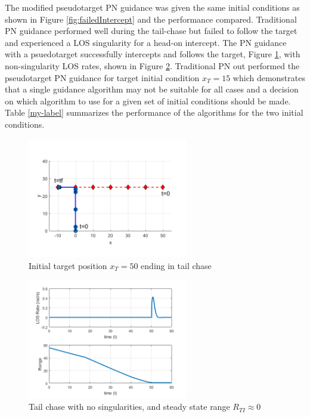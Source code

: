 \documentclass[conference]{IEEEtran}
\begin{document}
The modified pseudotarget PN guidance was given the same initial conditions as shown in Figure \ref{fig:failedIntercept} and the performance compared. Traditional PN guidance performed well during the tail-chase but failed to follow the target and experienced a LOS singularity for a head-on intercept. The PN guidance with a psuedotarget successfully intercepts and follows the target, Figure \ref{fig:modifiedPNsuccess}, with non-singularity LOS rates, shown in Figure \ref{fig:modifiedPNsuccessLOS}. Traditional PN out performed the pseudotarget PN guidance for target initial condition $x_{T} = 15$ which demonstrates that a single guidance algorithm may not be suitable for all cases and a decision on which algorithm to use for a given set of initial conditions should be made. Table \ref{my-label} summarizes the performance of the algorithms for the two initial conditions.



\begin{figure}[H]
	\centering
	\includegraphics[width=7cm] {ptx50}
	\caption{Initial target position $x_T=50$ ending in tail chase}
	\label{fig:modifiedPNsuccess}
	\hspace*{0mm}
\end{figure}
\begin{figure}[H]
	\centering
	\includegraphics[width=7cm] {ptx50_range_LOSrate}
	\caption{Tail chase with no singularities, and steady state range $R_{TI}\approx0$}
	\label{fig:modifiedPNsuccessLOS}
	\hspace*{0mm}
\end{figure}
\end{document}
